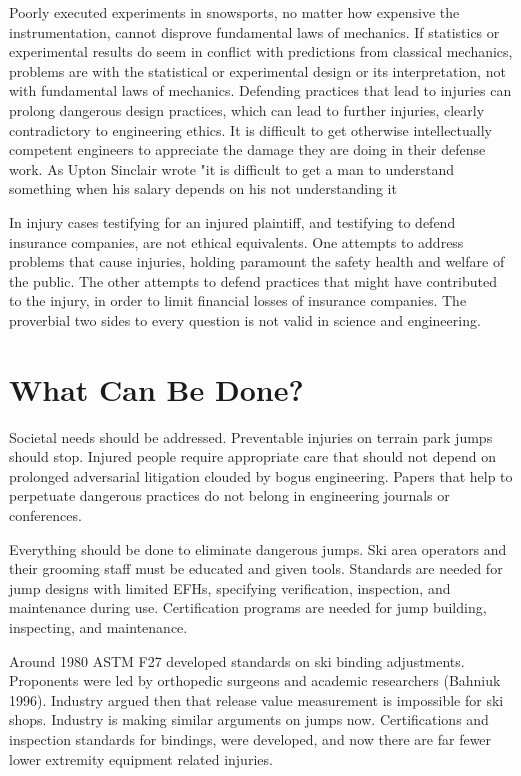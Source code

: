 \documentclass[smallextended]{svjour3}       %
\begin{document}
Poorly executed experiments in snowsports, no matter how expensive the
instrumentation, cannot disprove fundamental laws of mechanics. If statistics
or experimental results do seem in conflict with predictions from classical
mechanics, problems are with the statistical or experimental design or its
interpretation, not with fundamental laws of mechanics. Defending practices
that lead to injuries can prolong dangerous design practices, which can lead to
further injuries, clearly contradictory to engineering ethics. It is difficult
to get otherwise intellectually competent engineers to appreciate the damage
they are doing in their defense work.  As Upton Sinclair wrote "it is difficult
to get a man to understand something when his salary depends on his not
understanding it \cite{Sinclair1994}

In injury cases testifying for an injured plaintiff, and testifying to defend
insurance companies, are not ethical equivalents. One attempts to address
problems that cause injuries, holding paramount the safety health and welfare
of the public. The other attempts to defend practices that might have
contributed to the injury, in order to limit financial losses of insurance
companies. The proverbial two sides to every question is not valid in science
and engineering.

\section{What Can Be Done?}
\label{sec:action}
%
Societal needs should be addressed. Preventable injuries on terrain park jumps
should stop. Injured people require appropriate care that should not depend on
prolonged adversarial litigation clouded by bogus engineering. Papers that help
to perpetuate dangerous practices do not belong in engineering journals or
conferences.

Everything should be done to eliminate dangerous jumps.  Ski area operators and
their grooming staff must be educated and given tools. Standards are needed for
jump designs with limited EFHs, specifying verification, inspection, and
maintenance during use. Certification programs are needed for jump building,
inspecting, and maintenance.

Around 1980 ASTM F27 developed standards on ski binding adjustments. Proponents were led by orthopedic surgeons and academic researchers (Bahniuk 1996). Industry argued then that release value measurement is impossible for ski shops. Industry is making similar arguments on jumps now. Certifications and inspection standards for bindings, were developed, and now there are far fewer lower extremity equipment related injuries. 
\end{document}
